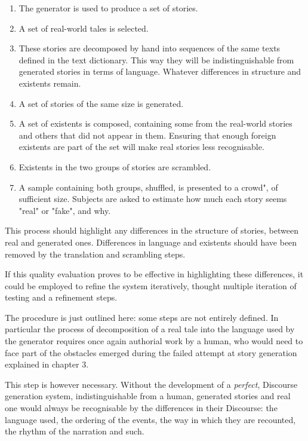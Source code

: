 \documentclass[12pt,a4paper,oneside]{report}
\begin{document}
\begin{enumerate}\setlength{\itemsep}{0pt}
\item The generator is used to produce a set of stories.
\item A set of real-world tales is selected. 
\item These stories are decomposed by hand into sequences of the same texts defined in the text dictionary. This way they will be indistinguishable from generated stories in terms of language. Whatever differences in structure and existents remain.
\item A set of stories of the same size is generated.
\item A set of existents is composed, containing some from the real-world stories and others that did not appear in them. Ensuring that enough foreign existents are part of the set will make real stories less recognisable.
\item Existents in the two groups of stories are scrambled.
\item A sample containing both groups, shuffled, is presented to a crowd", of sufficient size. Subjects are asked to estimate how much each story seems "real" or "fake", and why.
\end{enumerate}

This process should highlight any differences in the structure of stories, between real and generated ones. Differences in language and existents should have been removed by the translation and scrambling steps.

If this quality evaluation proves to be effective in highlighting these differences, it could be employed to refine the system iteratively, thought multiple iteration of testing and a refinement steps.

\bigskip

The procedure is just outlined here: some steps are not entirely defined. In particular the process of decomposition of a real tale into the language used by the generator requires once again authorial work by a human, who would need to face part of the obstacles emerged during the failed attempt at story generation explained in chapter 3.

This step is however necessary. Without the development of a \textit{perfect}, Discourse generation system, indistinguishable from a human, generated stories and real one would always be recognisable by the differences in their Discourse: the language used, the ordering of the events, the way in which they are recounted, the rhythm of the narration and such.
\end{document}
